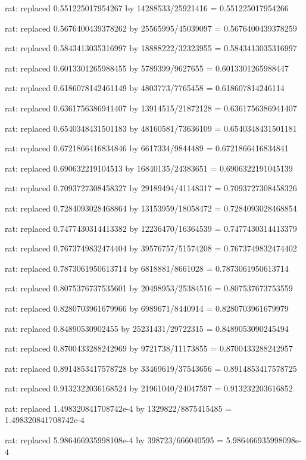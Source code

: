 \documentclass[a4paper,10pt]{article}
\begin{document}
\begin{eulernotebook}
\begin{eulercomment}
\begin{eulercomment}
\begin{eulercomment}
\begin{eulercomment}
\begin{eulercomment}
\begin{eulercomment}
\begin{eulercomment}
\begin{eulercomment}
\begin{eulercomment}
\begin{eulercomment}
\begin{eulercomment}
\begin{eulercomment}
\begin{eulercomment}
\begin{eulercomment}
\begin{eulercomment}
\begin{eulercomment}
\begin{euleroutput}
  rat: replaced 0.551225017954267 by 14288533/25921416 = 0.551225017954266
  
  rat: replaced 0.5676400439378262 by 25565995/45039097 = 0.5676400439378259
  
  rat: replaced 0.5843413035316997 by 18888222/32323955 = 0.5843413035316997
  
  rat: replaced 0.6013301265988455 by 5789399/9627655 = 0.6013301265988447
  
  rat: replaced 0.6186078142461149 by 4803773/7765458 = 0.618607814246114
  
  rat: replaced 0.6361756386941407 by 13914515/21872128 = 0.6361756386941407
  
  rat: replaced 0.6540348431501183 by 48160581/73636109 = 0.6540348431501181
  
  rat: replaced 0.6721866416834846 by 6617334/9844489 = 0.6721866416834841
  
  rat: replaced 0.690632219104513 by 16840135/24383651 = 0.6906322191045139
  
  rat: replaced 0.7093727308458327 by 29189494/41148317 = 0.7093727308458326
  
  rat: replaced 0.7284093028468864 by 13153959/18058472 = 0.7284093028468854
  
  rat: replaced 0.7477430314413382 by 12236470/16364539 = 0.7477430314413379
  
  rat: replaced 0.7673749832474404 by 39576757/51574208 = 0.7673749832474402
  
  rat: replaced 0.7873061950613714 by 6818881/8661028 = 0.7873061950613714
  
  rat: replaced 0.8075376737535601 by 20498953/25384516 = 0.807537673753559
  
  rat: replaced 0.8280703961679966 by 6989671/8440914 = 0.8280703961679979
  
  rat: replaced 0.84890530902455 by 25231431/29722315 = 0.8489053090245494
  
  rat: replaced 0.8700433288242969 by 9721738/11173855 = 0.8700433288242957
  
  rat: replaced 0.8914853417578728 by 33469619/37543656 = 0.8914853417578725
  
  rat: replaced 0.9132322036168524 by 21961040/24047597 = 0.913232203616852
  
  rat: replaced 1.498320841708742e-4 by 1329822/8875415485 = 1.498320841708742e-4
  
  rat: replaced 5.986466935998108e-4 by 398723/666040595 = 5.986466935998098e-4
  

\end{euleroutput}
\end{eulercomment}
\end{eulercomment}
\end{eulercomment}
\end{eulercomment}
\end{eulercomment}
\end{eulercomment}
\end{eulercomment}
\end{eulercomment}
\end{eulercomment}
\end{eulercomment}
\end{eulercomment}
\end{eulercomment}
\end{eulercomment}
\end{eulercomment}
\end{eulercomment}
\end{eulercomment}
\end{eulernotebook}
\end{document}
